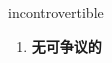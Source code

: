 
\begin{frame}
{\huge incontrovertible}
\begin{center}
\begin{enumerate}\Large
  \item \textbf{无可争议的}
\end{enumerate}
\end{center}
\end{frame}
